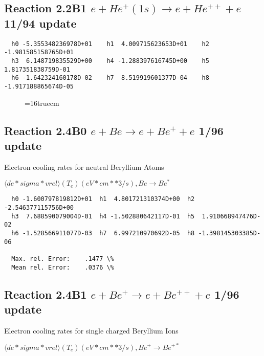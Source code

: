 \documentclass[12pt,dvipdfmx]{article}
\begin{document}
\subsection{
Reaction 2.2B1 $e + He^+(1s) \rightarrow e + He^{++} + e$ 11/94 update
}


\begin{small}\begin{verbatim}
  h0 -5.355348236978D+01    h1  4.009715623653D+01    h2 -1.981585158765D+01
  h3  6.148719835529D+00    h4 -1.288397616745D+00    h5  1.817351838759D-01
  h6 -1.642324160178D-02    h7  8.519919601377D-04    h8 -1.917188865674D-05
\end{verbatim}\end{small}

\begin{figure} \label{e2.2B}
\epsfxsize=16truecm
\end{figure}
\newpage

\subsection{
Reaction 2.4B0 $e + Be \rightarrow e + Be^+ + e $ 1/96 update
}

  Electron cooling rates for neutral
  Beryllium Atoms

 $ \langle de*sigma*vrel \rangle(T_e)  (eV*cm**3/s), Be  \rightarrow Be^*$

\begin{small}\begin{verbatim}
  h0 -1.600797819812D+01  h1  4.801721310374D+00  h2 -2.546377115756D+00
  h3  7.688590079004D-01  h4 -1.502880642117D-01  h5  1.910668947476D-02
  h6 -1.528566911077D-03  h7  6.997210970692D-05  h8 -1.398145303385D-06

  Max. rel. Error:    .1477 \%
  Mean rel. Error:    .0376 \%

\end{verbatim}\end{small}


\subsection{
Reaction 2.4B1 $e + Be^+ \rightarrow e + Be^{++} + e $ 1/96 update
}

  Electron cooling rates for single
  charged Beryllium Ions

 $ \langle de*sigma*vrel \rangle(T_e)  (eV*cm**3/s), Be^+ \rightarrow Be^{+*} $
\end{document}
